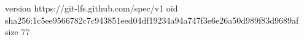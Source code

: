 version https://git-lfs.github.com/spec/v1
oid sha256:1c5ee9566782c7c943851eed04df19234a94a747f3e6e26a50d989f83d9689af
size 77
